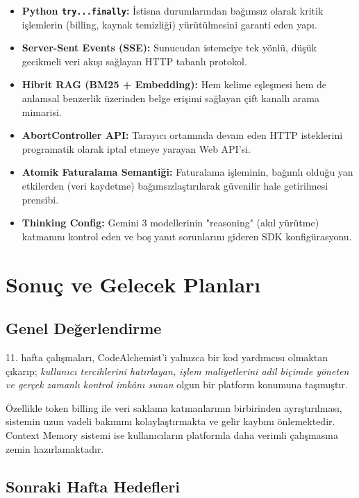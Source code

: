 \documentclass[12pt,a4paper]{article}
\begin{document}
\begin{itemize}[leftmargin=2em, itemsep=4pt]
    \item \textbf{Python \texttt{try...finally}:} İstisna durumlarından bağımsız olarak kritik işlemlerin (billing, kaynak temizliği) yürütülmesini garanti eden yapı.
    \item \textbf{Server-Sent Events (SSE):} Sunucudan istemciye tek yönlü, düşük gecikmeli veri akışı sağlayan HTTP tabanlı protokol.
    \item \textbf{Hibrit RAG (BM25 + Embedding):} Hem kelime eşleşmesi hem de anlamsal benzerlik üzerinden belge erişimi sağlayan çift kanallı arama mimarisi.
    \item \textbf{AbortController API:} Tarayıcı ortamında devam eden HTTP isteklerini programatik olarak iptal etmeye yarayan Web API'si.
    \item \textbf{Atomik Faturalama Semantiği:} Faturalama işleminin, bağımlı olduğu yan etkilerden (veri kaydetme) bağımsızlaştırılarak güvenilir hale getirilmesi prensibi.
    \item \textbf{Thinking Config:} Gemini 3 modellerinin "reasoning" (akıl yürütme) katmanını kontrol eden ve boş yanıt sorunlarını gideren SDK konfigürasyonu.
\end{itemize}

\section{Sonuç ve Gelecek Planları}

\subsection{Genel Değerlendirme}

11. hafta çalışmaları, CodeAlchemist'i yalnızca bir kod yardımcısı olmaktan çıkarıp; \emph{kullanıcı tercihlerini hatırlayan, işlem maliyetlerini adil biçimde yöneten ve gerçek zamanlı kontrol imkânı sunan} olgun bir platform konumuna taşımıştır.

Özellikle token billing ile veri saklama katmanlarının birbirinden ayrıştırılması, sistemin uzun vadeli bakımını kolaylaştırmakta ve gelir kaybını önlemektedir. Context Memory sistemi ise kullanıcıların platformla daha verimli çalışmasına zemin hazırlamaktadır.

\subsection{Sonraki Hafta Hedefleri}
\end{document}
